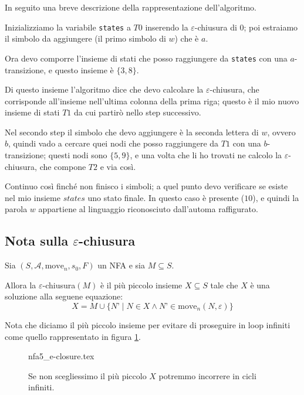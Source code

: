 \documentclass[class=book, crop=false, oneside, 12pt]{standalone}
\begin{document}
\noindent In seguito una breve descrizione della rappresentazione dell'algoritmo.

Inizializziamo la variabile \texttt{states} a \(T0\) inserendo la \(\varepsilon\)-chiusura di \(0\); poi estraiamo il simbolo da aggiungere (il primo simbolo di \(w\)) che è \(a\).

Ora devo comporre l’insieme di stati che posso raggiungere da \texttt{states} con una \(a\)-transizione, e questo insieme è \(\{3, 8\}\). 

Di questo insieme l’algoritmo dice che devo calcolare la \(\varepsilon\)-chiusura, che corrisponde all’insieme nell’ultima colonna della prima riga; questo è il mio nuovo insieme di stati \(T1\) da cui partirò nello step successivo.

Nel secondo step il simbolo che devo aggiungere è la seconda lettera di \(w\), ovvero \(b\), quindi vado a cercare quei nodi che posso raggiungere da \(T1\) con una \(b\)-transizione; questi nodi sono \(\{5,9\}\), e una volta che li ho trovati ne calcolo la \(\varepsilon\)-chiusura, che compone \(T2\) e via così.

Continuo così finché non finisco i simboli; a quel punto devo verificare se esiste nel mio insieme \(states\) uno stato finale. In questo caso è presente (\(10\)), e quindi la parola \(w\) appartiene al linguaggio riconosciuto dall’automa raffigurato.


\subsection{Nota sulla \(\varepsilon\)-chiusura}
\begin{theorem}
    Sia \((S, \mathcal{A}, \textrm{move}_n, s_0, F)\) un NFA e sia \(M \subseteq S\).
    
    Allora la \(\varepsilon\)-chiusura\((M)\) è il più piccolo insieme \(X \subseteq S\) tale che \(X\) è una soluzione alla seguene equazione:
    \begin{equation}
        X = M \cup \{ N’ \mid N \in X \land N’ \in \textrm{move}_n (N,\varepsilon)\}
        \label{eps-closure-set-eq}
    \end{equation}
\end{theorem}

\noindent Nota che diciamo il più piccolo insieme per evitare di proseguire in loop infiniti come quello rappresentato in figura \ref{nfa_ciclico}.

\begin{figure}
    \centering
    {nfa5_e-closure.tex}
    \caption{Se non scegliessimo il più piccolo \(X\) potremmo incorrere in cicli infiniti.}
    \label{nfa_ciclico}
\end{figure}
\end{document}
